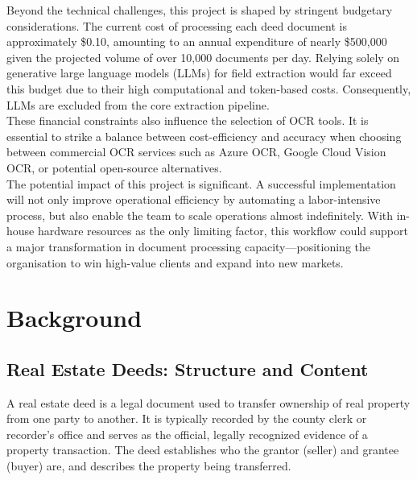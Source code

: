 \documentclass{article}
\begin{document}
Beyond the technical challenges, this project is shaped by stringent budgetary considerations. The current cost of processing each deed document is approximately \$0.10, amounting to an annual expenditure of nearly \$500,000 given the projected volume of over 10,000 documents per day. Relying solely on generative large language models (LLMs) for field extraction would far exceed this budget due to their high computational and token-based costs. Consequently, LLMs are excluded from the core extraction pipeline. \\

These financial constraints also influence the selection of OCR tools. It is essential to strike a balance between cost-efficiency and accuracy when choosing between commercial OCR services such as Azure OCR, Google Cloud Vision OCR, or potential open-source alternatives. \\

The potential impact of this project is significant. A successful implementation will not only improve operational efficiency by automating a labor-intensive process, but also enable the team to scale operations almost indefinitely. With in-house hardware resources as the only limiting factor, this workflow could support a major transformation in document processing capacity—positioning the organisation to win high-value clients and expand into new markets. \\

\section{Background}

\subsection{Real Estate Deeds: Structure and Content}

A real estate deed is a legal document used to transfer ownership of real property from one party to another. It is typically recorded by the county clerk or recorder's office and serves as the official, legally recognized evidence of a property transaction. The deed establishes who the grantor (seller) and grantee (buyer) are, and describes the property being transferred. \\
\end{document}
